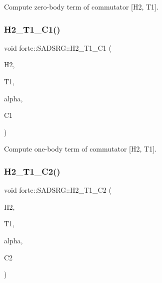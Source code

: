 Compute zero-\/body term of commutator \mbox{[}H2, T1\mbox{]}. 

\mbox{\label{classforte_1_1_s_a_d_s_r_g_ae2b3e419eb83ae278fda956afc4d481a}} 
\subsubsection{\texorpdfstring{H2\+\_\+\+T1\+\_\+\+C1()}{H2\_T1\_C1()}}
{\footnotesize\ttfamily void forte\+::\+S\+A\+D\+S\+R\+G\+::\+H2\+\_\+\+T1\+\_\+\+C1 (\begin{DoxyParamCaption}\item[{Blocked\+Tensor \&}]{H2,  }\item[{Blocked\+Tensor \&}]{T1,  }\item[{const double \&}]{alpha,  }\item[{Blocked\+Tensor \&}]{C1 }\end{DoxyParamCaption})\hspace{0.3cm}{\ttfamily [protected]}}



Compute one-\/body term of commutator \mbox{[}H2, T1\mbox{]}. 

\mbox{\label{classforte_1_1_s_a_d_s_r_g_aaeae903134b984ce6a9598b7058338d2}} 
\subsubsection{\texorpdfstring{H2\+\_\+\+T1\+\_\+\+C2()}{H2\_T1\_C2()}}
{\footnotesize\ttfamily void forte\+::\+S\+A\+D\+S\+R\+G\+::\+H2\+\_\+\+T1\+\_\+\+C2 (\begin{DoxyParamCaption}\item[{Blocked\+Tensor \&}]{H2,  }\item[{Blocked\+Tensor \&}]{T1,  }\item[{const double \&}]{alpha,  }\item[{Blocked\+Tensor \&}]{C2 }\end{DoxyParamCaption})\hspace{0.3cm}{\ttfamily [protected]}}



